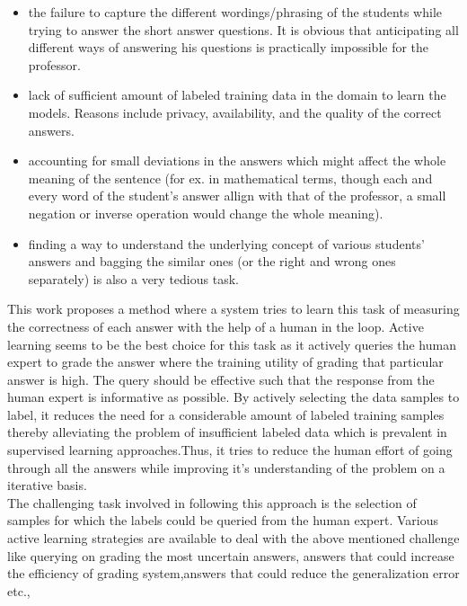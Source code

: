 \documentclass[rnd]{mas_proposal}
\begin{document}
\begin{itemize}
\begin{itemize}

\item the failure to capture the different wordings/phrasing of the students while trying to answer the short answer questions. It is obvious that anticipating all different ways of answering his questions is practically impossible for the professor. 

\item lack of sufficient amount of labeled training data in the domain to learn the models. Reasons include privacy, availability, and the quality of the correct answers. 

\item accounting for small deviations in the answers which might affect the whole meaning of the sentence (for ex. in mathematical terms, though each and every word of the student's answer allign with that of the professor, a small negation or inverse operation would change the whole meaning).

\item finding a way to understand the underlying concept of various students' answers and bagging the similar ones (or the right and wrong ones separately) is also a very tedious task. \\

\end{itemize}

This work proposes a method where a system tries to learn this task of measuring the correctness of each answer with the help of a human in the loop. Active learning seems to be the best choice for this task as it actively queries
the human expert to grade the answer where the training utility of grading that particular answer is high. The query should be effective such that the response from the human expert is informative as possible. By actively selecting the data samples to label, it reduces the need for a considerable amount of labeled training samples thereby alleviating the problem of insufficient labeled data which is prevalent in supervised learning approaches.Thus, it tries to reduce the human effort of going through all the answers while improving it's understanding of the problem on a iterative basis. \\

The challenging task involved in following this approach is the selection of samples for which the labels could be queried from the human expert. Various active learning strategies are available to deal with the above mentioned challenge like querying on grading the most uncertain answers, answers that could increase the efficiency of grading system,answers that could reduce the generalization error etc.,


\end{itemize}
\end{document}
